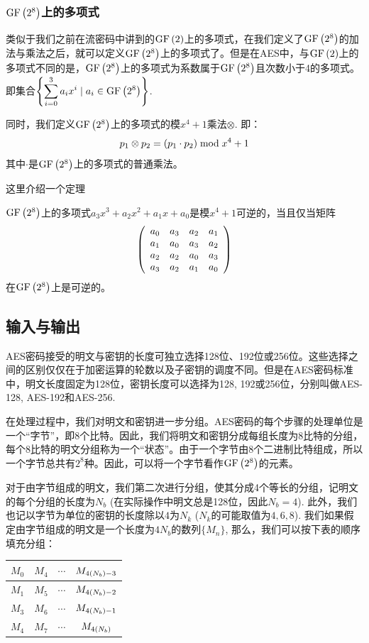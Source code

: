 \subsubsection{$\mathrm{GF}\left( {2^8}\right)$上的多项式}
类似于我们之前在流密码中讲到的$\mathrm{GF}\left( {2}\right)$上的多项式，在我们定义了$\mathrm{GF}\left( {2^8}\right)$的加法与乘法之后，就可以定义$\mathrm{GF}\left( {2^8}\right)$上的多项式了。但是在AES中，与$\mathrm{GF}\left( {2}\right)$上的多项式不同的是，$\mathrm{GF}\left( {2^8}\right)$上的多项式为系数属于$\mathrm{GF}\left( {2^8}\right)$且次数小于4的多项式。即集合$\displaystyle\left\{ {\sum_{i=0}^3a_ix^i\mid a_i\in\mathrm{GF}\left( {2^8}\right)} \right\}$.\par
同时，我们定义$\mathrm{GF}\left( {2^8}\right)$上的多项式的模$x^4+1$乘法$\otimes$. 即：
\begin{equation}
p_1\otimes p_2=\left( {p_1\cdot p_2}\right)\bmod{x^4+1}
\end{equation}
其中$\cdot$是$\mathrm{GF}\left( {2^8}\right)$上的多项式的普通乘法。\par
这里介绍一个定理
\begin{theorem}
$\mathrm{GF}\left( {2^8}\right)$上的多项式$a_3x^3+a_2x^2+a_1x+a_0$是模$x^4+1$可逆的，当且仅当矩阵
\[\left( {\begin{array}{cccc}a_0&a_3&a_2&a_1\\a_1&a_0&a_3&a_2\\a_2&a_2&a_0&a_3\\a_3&a_2&a_1&a_0\end{array}}\right)\]
在$\mathrm{GF}\left( {2^8}\right)$上是可逆的。
\end{theorem}
\subsection{输入与输出}
AES密码接受的明文与密钥的长度可独立选择128位、192位或256位。这些选择之间的区别仅仅在于加密运算的轮数以及子密钥的调度不同。但是在AES密码标准中，明文长度固定为128位，密钥长度可以选择为128, 192或256位，分别叫做AES-128, AES-192和AES-256.\par
在处理过程中，我们对明文和密钥进一步分组。AES密码的每个步骤的处理单位是一个“字节”，即8个比特。因此，我们将明文和密钥分成每组长度为8比特的分组，每个8比特的明文分组称为一个“状态”。由于一个字节由8个二进制比特组成，所以一个字节总共有$2^8$种。因此，可以将一个字节看作$\mathrm{GF}\left( {2^8}\right)$的元素。\par
对于由字节组成的明文，我们第二次进行分组，使其分成4个等长的分组，记明文的每个分组的长度为$N_b$ (在实际操作中明文总是128位，因此$N_b=4$). 此外，我们也记以字节为单位的密钥的长度除以$4$为$N_k$ ($N_k$的可能取值为$4, 6, 8$). 我们如果假定由字节组成的明文是一个长度为$4N_b$的数列$\{M_n\}$, 那么，我们可以按下表的顺序填充分组：
\begin{table}[H]
\centering
\begin{tabular}{c|c|c|c}\hline
$M_0$&$M_4$&$\cdots$&$M_{4\left( {N_b}\right)-3}$\\\hline
$M_1$&$M_5$&$\cdots$&$M_{4\left( {N_b}\right)-2}$\\\hline
$M_3$&$M_6$&$\cdots$&$M_{4\left( {N_b}\right)-1}$\\\hline
$M_4$&$M_7$&$\cdots$&$M_{4\left( {N_b}\right)}$\\\hline
\end{tabular}
\end{table}


